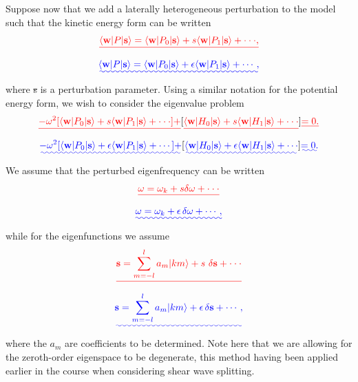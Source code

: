 \documentclass[a4paper,12pt]{paper}
\providecommand{\DIFadd}[1]{{\protect\color{blue}\uwave{#1}}} %
\providecommand{\DIFdel}[1]{{\protect\color{red}\sout{#1}}}                      %
\providecommand{\DIFaddbegin}{} %
\providecommand{\DIFaddend}{} %
\providecommand{\DIFdelbegin}{} %
\providecommand{\DIFdelend}{} %
\begin{document}
Suppose now that we add a laterally heterogeneous perturbation to the model such that the kinetic energy form can be written
\DIFdelbegin \begin{displaymath}
\DIFdel{\langle \mathbf{w}|P|\mathbf{s}\rangle=\langle \mathbf{w}|P_{0}|\mathbf{s}\rangle+s\langle \mathbf{w}|P_{1}|\mathbf{s}\rangle+\cdot\cdot\cdot,
}\end{displaymath}%
\DIFdelend \DIFaddbegin \begin{equation}\DIFadd{\label{eq:21}
\langle \mathbf{w}|P|\mathbf{s}\rangle=\langle \mathbf{w}|P_{0}|\mathbf{s}\rangle+\epsilon\langle \mathbf{w}|P_{1}|\mathbf{s}\rangle+\cdots,
}\end{equation}\DIFaddend 
where \DIFdelbegin \DIFdel{s }\DIFdelend \DIFaddbegin \DIFadd{$\epsilon$ }\DIFaddend is a perturbation parameter. Using a similar notation for the potential energy form, we wish to consider the eigenvalue problem
\DIFdelbegin \begin{displaymath}
\DIFdel{-\omega^{2}[\langle \mathbf{w}|P_{0}|\mathbf{s}\rangle+s\langle \mathbf{w}|P_{1}|\mathbf{s}\rangle+\cdot\cdot\cdot]
+}[\DIFdel{\langle \mathbf{w}|H_{0}|\mathbf{s}\rangle+s\langle \mathbf{w}|H_{1}|\mathbf{s}\rangle+\cdot\cdot\cdot}]\DIFdel{=0.
}\end{displaymath}%
\DIFdelend \DIFaddbegin \begin{equation}\DIFadd{\label{eq:22}
-\omega^{2}[\langle \mathbf{w}|P_{0}|\mathbf{s}\rangle+\epsilon\langle \mathbf{w}|P_{1}|\mathbf{s}\rangle+\cdots]
+}[\DIFadd{\langle \mathbf{w}|H_{0}|\mathbf{s}\rangle+\epsilon\langle \mathbf{w}|H_{1}|\mathbf{s}\rangle+\cdots}]\DIFadd{=0.
}\end{equation}\DIFaddend 
We assume that the perturbed eigenfrequency can be written
\DIFdelbegin \begin{displaymath}
\DIFdel{\omega=\omega_{k}+s\delta\omega+\cdot\cdot\cdot
}\end{displaymath}%
\DIFdelend \DIFaddbegin \begin{equation}\DIFadd{\label{eq:23}
\omega=\omega_{k}+\epsilon\,\delta\omega+\cdots,
}\end{equation}\DIFaddend 
while for the eigenfunctions we assume
\DIFdelbegin \begin{displaymath}
\DIFdel{\mathbf{s}=\sum_{m=-l}^{l}a_{m}|km\rangle+s~\delta\mathbf{s}+\cdot\cdot\cdot
}\end{displaymath}%
\DIFdelend \DIFaddbegin \begin{equation}\DIFadd{\label{eq:24}
\mathbf{s}=\sum_{m=-l}^{l}a_{m}|km\rangle+\epsilon\,\delta\mathbf{s}+\cdots,
}\end{equation}\DIFaddend 
where the $a_{m}$ are coefficients to be determined. Note here that we are allowing for the zeroth-order eigenspace to be degenerate,
 this method having been applied earlier in the course when considering shear wave splitting. 
\end{document}
